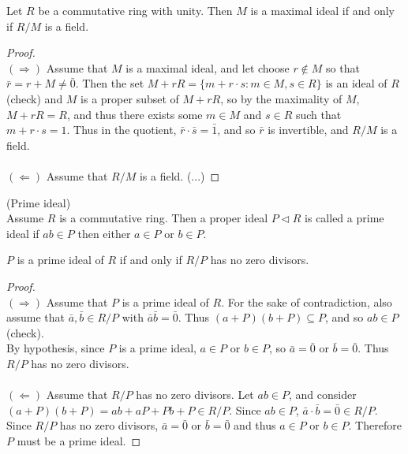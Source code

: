 \documentclass{article}
\newenvironment{definition}[1][Definition.]{
  \begin{trivlist} \item[\hskip \labelsep {\bfseries #1}]
}{\end{trivlist}}
\newenvironment{theorem}[1][Theorem.]{
  \begin{trivlist} \item[\hskip \labelsep {\bfseries #1}]
}{\end{trivlist}}
\newcommand{\set}[1]{\{ #1 \}}
\begin{document}
\begin{theorem}[Lemma.]
  Let $R$ be a commutative ring with unity. Then $M$ is a maximal ideal if and
  only if $R/M$ is a field.
\end{theorem}
\begin{proof} $ $ \\
  $(\Longrightarrow)$ Assume that $M$ is a maximal ideal, and let choose
  $r \not\in M$ so that $\bar r = r + M \neq \bar 0$. Then the set
  $M + rR = \set{m + r \cdot s : m \in M, s \in R}$ is an ideal of $R$ (check)
  and $M$ is a proper subset of $M + rR$, so by the maximality of $M$,
  $M + rR = R$, and thus there exists some $m \in M$ and $s \in R$ such that
  $m + r\cdot s = 1$. Thus in the quotient, $\bar r \cdot \bar s = \bar 1$,
  and so $\bar r$ is invertible, and $R/M$ is a field.
  \\~\\
  $(\Longleftarrow)$ Assume that $R/M$ is a field. (...)
\end{proof}
\begin{definition}(Prime ideal) \\
  Assume $R$ is a commutative ring. Then a proper ideal $P \vartriangleleft R$
  is called a prime ideal if $ab \in P$ then either $a \in P$ or $b \in P$.
\end{definition}
\begin{theorem}[Lemma.]
  $P$ is a prime ideal of $R$ if and only if $R/P$ has no zero divisors.
\end{theorem}
\begin{proof} $ $ \\
  $(\Longrightarrow)$ Assume that $P$ is a prime ideal of $R$. For the sake of
  contradiction, also assume that $\bar a, \bar b \in R/P$ with $\bar a \bar b = \bar 0$.
  Thus $(a + P)(b + P) \subseteq P$, and so $ab \in P$ (check).\\
  By hypothesis, since $P$ is a prime ideal, $a \in P$ or $b \in P$,
  so $\bar a = \bar 0$ or $\bar b = \bar 0$. Thus $R/P$ has no zero divisors.
  \\~\\
  $(\Longleftarrow)$ Assume that $R/P$ has no zero divisors. Let $ab \in P$,
  and consider $(a + P)(b + P) = ab + aP + Pb + P \in R/P$. Since $ab \in P$,
  $\bar a \cdot \bar b = \bar 0 \in R/P$. Since $R/P$ has no zero divisors,
  $\bar a = \bar 0$ or $\bar b = \bar 0$ and thus $a \in P$ or $b \in P$.
  Therefore $P$ must be a prime ideal.
\end{proof}
\end{document}
